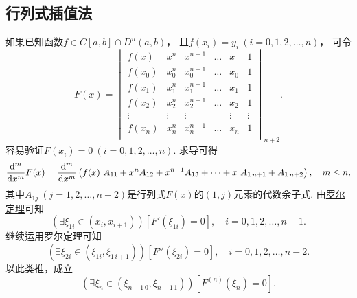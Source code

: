 \subsection{行列式插值法}
如果已知函数\(f \in C[a,b] \cap D^n(a,b)\)，
且\(f(x_i) = y_i\ (i=0,1,2,\dotsc,n)\)，
可令\[
	F(x) = \begin{vmatrix}
		f(x) & x^n & x^{n-1} & \dots & x & 1 \\
		f(x_0) & x_0^n & x_0^{n-1} & \dots & x_0 & 1 \\
		f(x_1) & x_1^n & x_1^{n-1} & \dots & x_1 & 1 \\
		f(x_2) & x_2^n & x_2^{n-1} & \dots & x_2 & 1 \\
		\vdots & \vdots & \vdots & & \vdots & \vdots \\
		f(x_n) & x_n^n & x_n^{n-1} & \dots & x_n & 1 \\
	\end{vmatrix}_{n+2}.
\]
容易验证\(F(x_i) = 0\ (i=0,1,2,\dotsc,n)\).
求导可得\[
	\dv[m]{x} F(x)
	= \dv[m]{x} \left(
		f(x)~A_{11}
		+ x^n A_{12}
		+ x^{n-1} A_{13}
		+ \dotsb
		+ x~A_{1\,n+1}
		+ A_{1\,n+2}
	\right),
	\quad m \leq n,
\]
其中\(A_{1j}\ (j=1,2,\dotsc,n+2)\)是行列式\(F(x)\)的\((1,j)\)元素的代数余子式.
由\hyperref[theorem:微分中值定理.罗尔定理]{罗尔定理}可知\[
	(\exists\xi_{1i}\in(x_i,x_{i+1}))
	[F'(\xi_{1i}) = 0],
	\quad i=0,1,2,\dotsc,n-1.
\]
继续运用罗尔定理可知\[
	(\exists\xi_{2i}\in(\xi_{1i},\xi_{1\,i+1}))
	[F''(\xi_{2i}) = 0],
	\quad i=0,1,2,\dotsc,n-2.
\]
以此类推，成立\[
	(\exists\xi_n\in(\xi_{n-1\,0},\xi_{n-1\,1}))
	[F^{(n)}(\xi_n) = 0].
\]
